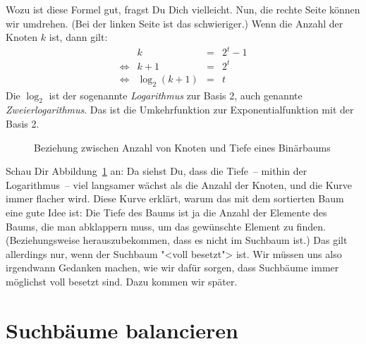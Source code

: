 %
Wozu ist diese Formel gut, fragst Du Dich vielleicht.  Nun, die rechte
Seite können wir umdrehen.  (Bei der linken Seite ist das
schwieriger.) Wenn die Anzahl der Knoten $k$ ist, dann gilt:
%
\begin{displaymath}
  \begin{array}{lrcl}
    & k &=& 2^t - 1\\
    \Longleftrightarrow & k + 1 &=& 2^t\\
    \Longleftrightarrow & \log_2(k+1) &=& t
  \end{array}
\end{displaymath}
%
Die $\log_2$ ist der sogenannte
\textit{Logarithmus} zur Basis 2, auch genannte
\textit{Zweierlogarithmus}.  Das ist die
Umkehrfunktion zur Exponentialfunktion mit der Basis 2.

\begin{figure}[tb]
  \centering
{}
  \caption{Beziehung zwischen Anzahl von Knoten und Tiefe eines Binärbaums}
  \label{fig:log2}
\end{figure}

Schau Dir Abbildung~\ref{fig:log2} an: Da siehst Du, dass die Tiefe~--
mithin der Logarithmus~-- viel langsamer wächst als die Anzahl der
Knoten, und die Kurve immer flacher wird.  Diese Kurve erklärt, warum
das mit dem sortierten Baum eine gute Idee ist: Die Tiefe des Baums ist ja
die Anzahl der Elemente des Baums, die man abklappern muss, um das
gewünschte Element zu finden.  (Beziehungsweise herauszubekommen, dass
es nicht im Suchbaum ist.)  Das gilt allerdings nur, wenn der Suchbaum
"<voll besetzt"> ist.  Wir müssen uns also irgendwann Gedanken machen,
wie wir dafür sorgen, dass Suchbäume immer möglichst voll besetzt
sind.  Dazu kommen wir später.

\section{Suchbäume balancieren}
\label{sec:balancierte-suchbaeume}

